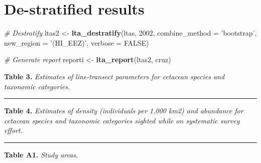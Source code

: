 \documentclass[
]{book}
\newenvironment{Shaded}{\begin{snugshade}}{\end{snugshade}}
\newcommand{\CommentTok}[1]{\textcolor[rgb]{0.56,0.35,0.01}{\textit{#1}}}
\newcommand{\DataTypeTok}[1]{\textcolor[rgb]{0.13,0.29,0.53}{#1}}
\newcommand{\DecValTok}[1]{\textcolor[rgb]{0.00,0.00,0.81}{#1}}
\newcommand{\KeywordTok}[1]{\textcolor[rgb]{0.13,0.29,0.53}{\textbf{#1}}}
\newcommand{\NormalTok}[1]{#1}
\newcommand{\OperatorTok}[1]{\textcolor[rgb]{0.81,0.36,0.00}{\textbf{#1}}}
\newcommand{\OtherTok}[1]{\textcolor[rgb]{0.56,0.35,0.01}{#1}}
\newcommand{\StringTok}[1]{\textcolor[rgb]{0.31,0.60,0.02}{#1}}
\begin{document}
\hypertarget{de-stratified-results}{%
\section*{De-stratified results}\label{de-stratified-results}}

\begin{Shaded}
\begin{Highlighting}[]
\CommentTok{# Destratify}
\NormalTok{ltas2 <-}\StringTok{ }\KeywordTok{lta_destratify}\NormalTok{(ltas, }\DecValTok{2002}\NormalTok{,}
                        \DataTypeTok{combine_method =} \StringTok{'bootstrap'}\NormalTok{,}
                        \DataTypeTok{new_region =} \StringTok{'(HI_EEZ)'}\NormalTok{,}
                        \DataTypeTok{verbose =} \OtherTok{FALSE}\NormalTok{)}

\CommentTok{# Generate report}
\NormalTok{reporti <-}\StringTok{ }\KeywordTok{lta_report}\NormalTok{(ltas2, cruz)}
\end{Highlighting}
\end{Shaded}

\textbf{Table 3.} \emph{Estimates of line-transect parameters for cetacean species and taxonomic categories.}

\begin{Shaded}
\end{Shaded}

\begin{center}\rule{0.5\linewidth}{0.5pt}\end{center}

\textbf{Table 4.} \emph{Estimates of density (individuals per 1,000 km2) and abundance for cetacean species and taxonomic categories sighted while on systematic survey effort.}

\begin{Shaded}
\end{Shaded}

\begin{center}\rule{0.5\linewidth}{0.5pt}\end{center}

\textbf{Table A1.} \emph{Study areas}.
\end{document}
